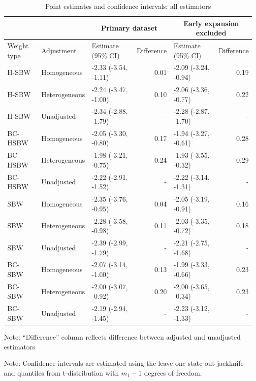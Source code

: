 \begin{table}[h!]
\centering
\begin{threeparttable}
\caption{Point estimates and confidence intervals: all estimators}
\label{tab:confintmain}
\begin{tabular}{lllrlr}
\hline
 &  & \multicolumn{2}{c}{Primary dataset} & \multicolumn{2}{c}{Early expansion 
 excluded} \\
  \hline
Weight type & Adjustment & Estimate (95\% CI) & Difference & Estimate (95\% CI) & Difference \\ 
  \hline
H-SBW & Homogeneous & -2.33 (-3.54, -1.11) & 0.01 & -2.09 (-3.24, -0.94) & 0.19 \\ 
  H-SBW & Heterogeneous & -2.24 (-3.47, -1.00) & 0.10 & -2.06 (-3.36, -0.77) & 0.22 \\ 
  H-SBW & Unadjusted & -2.34 (-2.88, -1.79) & - & -2.28 (-2.87, -1.70) & - \\ 
  BC-HSBW & Homogeneous & -2.05 (-3.30, -0.80) & 0.17 & -1.94 (-3.27, -0.61) & 0.28 \\ 
  BC-HSBW & Heterogeneous & -1.98 (-3.21, -0.75) & 0.24 & -1.93 (-3.55, -0.32) & 0.29 \\ 
  BC-HSBW & Unadjusted & -2.22 (-2.91, -1.52) & - & -2.22 (-3.14, -1.31) & - \\ 
  SBW & Homogeneous & -2.35 (-3.76, -0.95) & 0.04 & -2.05 (-3.19, -0.91) & 0.16 \\ 
  SBW & Heterogeneous & -2.28 (-3.58, -0.98) & 0.11 & -2.03 (-3.35, -0.72) & 0.18 \\ 
  SBW & Unadjusted & -2.39 (-2.99, -1.79) & - & -2.21 (-2.75, -1.68) & - \\ 
  BC-SBW & Homogeneous & -2.07 (-3.14, -1.00) & 0.13 & -1.99 (-3.33, -0.66) & 0.23 \\ 
  BC-SBW & Heterogeneous & -2.00 (-3.07, -0.92) & 0.20 & -2.00 (-3.65, -0.34) & 0.23 \\ 
  BC-SBW & Unadjusted & -2.19 (-2.94, -1.45) & - & -2.23 (-3.12, -1.33) & - \\ 
   \hline
\end{tabular}
    \begin{tablenotes}
      \item[] Note: ``Difference'' column reflects difference between adjusted and unadjusted estimators
        \item[] Note: Confidence intervals are estimated using the leave-one-state-out jackknife and quantiles from t-distribution with $m_1 - 1$ degrees of freedom.
    \end{tablenotes}
\end{threeparttable}
\end{table}


